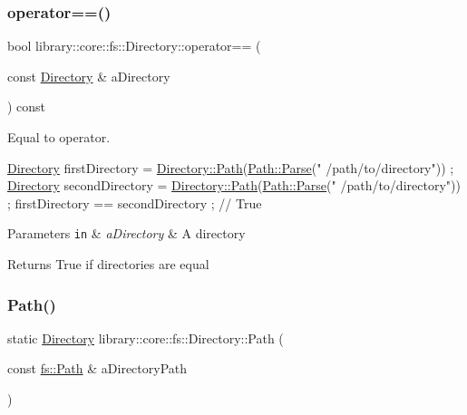 \subsubsection{\texorpdfstring{operator==()}{operator==()}}
{\footnotesize\ttfamily bool library\+::core\+::fs\+::\+Directory\+::operator== (\begin{DoxyParamCaption}\item[{const \hyperlink{classlibrary_1_1core_1_1fs_1_1Directory}{Directory} \&}]{a\+Directory }\end{DoxyParamCaption}) const}



Equal to operator. 


\begin{DoxyCode}
\hyperlink{classlibrary_1_1core_1_1fs_1_1Directory_a3ec39f6cad19a81d520e9a1f2d8bb1f7}{Directory} firstDirectory = \hyperlink{classlibrary_1_1core_1_1fs_1_1Directory_a6d3ea04654841e62a4dbd99feb563caf}{Directory::Path}(\hyperlink{classlibrary_1_1core_1_1fs_1_1Path_aebf5bd3af83e0b7376616e146f3e55df}{Path::Parse}(\textcolor{stringliteral}{"
      /path/to/directory"})) ;
\hyperlink{classlibrary_1_1core_1_1fs_1_1Directory_a3ec39f6cad19a81d520e9a1f2d8bb1f7}{Directory} secondDirectory = \hyperlink{classlibrary_1_1core_1_1fs_1_1Directory_a6d3ea04654841e62a4dbd99feb563caf}{Directory::Path}(\hyperlink{classlibrary_1_1core_1_1fs_1_1Path_aebf5bd3af83e0b7376616e146f3e55df}{Path::Parse}(\textcolor{stringliteral}{"
      /path/to/directory"})) ;
firstDirectory == secondDirectory ; \textcolor{comment}{// True}
\end{DoxyCode}



\begin{DoxyParams}[1]{Parameters}
\mbox{\tt in}  & {\em a\+Directory} & A directory \\
\hline
\end{DoxyParams}
\begin{DoxyReturn}{Returns}
True if directories are equal 
\end{DoxyReturn}
\mbox{\label{classlibrary_1_1core_1_1fs_1_1Directory_a6d3ea04654841e62a4dbd99feb563caf}} 
\subsubsection{\texorpdfstring{Path()}{Path()}}
{\footnotesize\ttfamily static \hyperlink{classlibrary_1_1core_1_1fs_1_1Directory}{Directory} library\+::core\+::fs\+::\+Directory\+::\+Path (\begin{DoxyParamCaption}\item[{const \hyperlink{classlibrary_1_1core_1_1fs_1_1Path}{fs\+::\+Path} \&}]{a\+Directory\+Path }\end{DoxyParamCaption})\hspace{0.3cm}{\ttfamily [static]}}



